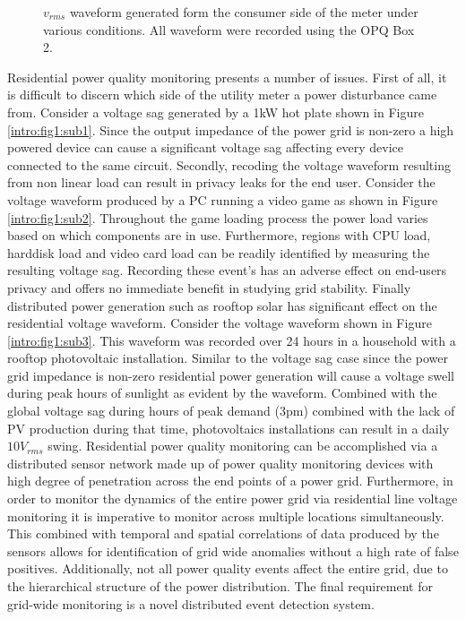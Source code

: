 \begin{figure}[h]
    \caption{$v_{rms}$ waveform generated form the consumer side of the meter under various conditions.
    All waveform were recorded using the OPQ Box 2.}
    \label{intro:fig:1}
\end{figure}

Residential power quality monitoring presents a number of issues.
First of all, it is difficult to discern which side of the utility meter a power disturbance came from.
Consider a voltage sag generated by a 1kW hot plate shown in Figure \ref{intro:fig1:sub1}.
Since the output impedance of the power grid is non-zero a high powered device can cause a significant voltage sag affecting every device connected to the same circuit.
Secondly, recoding the voltage waveform resulting from non linear load can result in privacy leaks for the end user.
Consider the voltage waveform produced by a PC running a video game as shown in Figure \ref{intro:fig1:sub2}.
Throughout the game loading process the power load varies based on which components are in use.
Furthermore, regions with CPU load, harddisk load and video card load can be readily identified by measuring the resulting voltage sag.
Recording these event's has an adverse effect on end-users privacy and offers no immediate benefit in studying grid stability.
Finally distributed power generation such as rooftop solar has significant effect on the residential voltage waveform.
Consider the voltage waveform shown in Figure \ref{intro:fig1:sub3}.
This waveform was recorded over 24 hours in a household with a rooftop photovoltaic installation.
Similar to the voltage sag case since the power grid impedance is non-zero residential power generation will cause a voltage swell during peak hours of sunlight as evident by the waveform.
Combined with the global voltage sag during hours of peak demand (3pm) combined with the lack of PV production during that time, photovoltaics installations can result in a daily $10V_{rms}$ swing.
Residential power quality monitoring can be accomplished via a distributed sensor network made up of power quality monitoring devices with high degree of penetration across the end points of a power grid.
Furthermore, in order to monitor the dynamics of the entire power grid via residential line voltage monitoring it is imperative to monitor across multiple locations simultaneously.
This combined with temporal and spatial correlations of data produced by the sensors allows for identification of grid wide anomalies without a high rate of false positives.
Additionally, not all power quality events affect the entire grid, due to the hierarchical structure of the power distribution.
The final requirement for grid-wide monitoring is a novel distributed event detection system.

